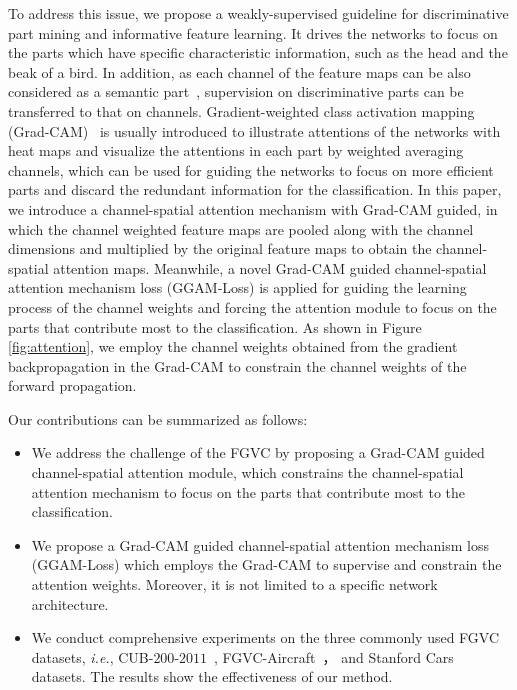 \documentclass{article}
\begin{document}
To address this issue, we propose a weakly-supervised guideline for discriminative part mining and informative feature learning. It drives the networks to focus on the parts which have specific characteristic information, such as the head and the beak of a bird. In addition, as each channel of the feature maps can be also considered as a semantic part~\cite{MA-CNN}, supervision on discriminative parts can be transferred to that on channels. Gradient-weighted class activation mapping (Grad-CAM)~\cite{cam} is usually introduced to illustrate attentions of the networks with heat maps and visualize the attentions in each part by weighted averaging channels, which can be used for guiding the networks to focus on more efficient parts and discard the redundant information for the classification. In this paper, we introduce a channel-spatial attention mechanism with Grad-CAM guided, in which the channel weighted feature maps are pooled along with the channel dimensions and multiplied by the original feature maps to obtain the channel-spatial attention maps. Meanwhile, a novel Grad-CAM guided channel-spatial attention mechanism loss (GGAM-Loss) is applied for guiding the learning process of the channel weights and forcing the attention module to focus on the parts that contribute most to the classification. As shown in Figure \ref{fig:attention}, we employ the channel weights obtained from the gradient backpropagation in the Grad-CAM to constrain the channel weights of the forward propagation. 

Our contributions can be summarized as follows:
\vspace{-1mm}
\begin{itemize}
	\item We address the challenge of the FGVC by proposing a Grad-CAM guided channel-spatial attention module, which constrains the channel-spatial attention mechanism to focus on the parts that contribute most to the classification.
\vspace{-1mm}	
	\item We propose a Grad-CAM guided channel-spatial attention mechanism loss (GGAM-Loss) which employs the Grad-CAM to supervise and constrain the attention weights. Moreover, it is not limited to a specific network architecture.
\vspace{-1mm}	
	\item We conduct comprehensive experiments on the three commonly used FGVC datasets, \emph{i.e.}, CUB-$200$-$2011$~\cite{birds},  FGVC-Aircraft~\cite{air}， and Stanford Cars~\cite{cars} datasets. The results show the effectiveness of our method.
\end{itemize}
\vspace{-3mm}
\end{document}
